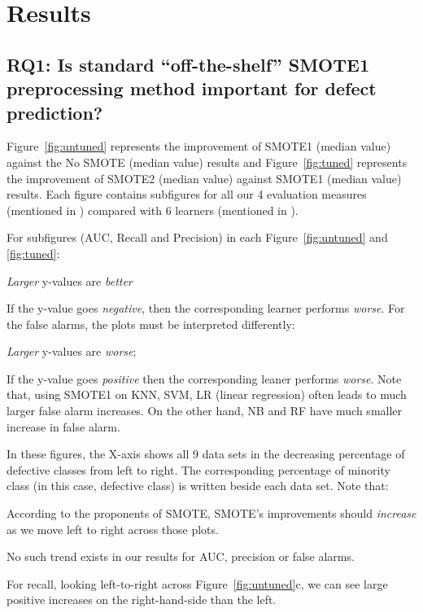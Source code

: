 \section{Results}
\label{sect:results}

\subsection{\textbf{RQ1: Is standard ``off-the-shelf'' SMOTE1 preprocessing method important for defect prediction?}}
Figure~\ref{fig:untuned} represents the improvement of SMOTE1 (median value) against the No SMOTE (median value) results and Figure~\ref{fig:tuned} represents the improvement of SMOTE2 (median value) against SMOTE1 (median value) results. Each figure contains subfigures for all our 4 evaluation measures (mentioned in ) compared with 6 learners (mentioned in ). 



For subfigures (AUC, Recall and Precision) in each Figure~\ref{fig:untuned} and \ref{fig:tuned}:
\bi
\item 
{\em Larger} y-values
are {\em better} 
\item
If the y-value goes {\em negative}, then the corresponding learner performs {\em worse}. 
\ei
For the false alarms, the
plots must be interpreted differently:
\bi
\item
{\em Larger} y-values are {\em worse};
\item
If the y-value goes {\em positive} then
the corresponding leaner
performs {\em worse}.
\ei
Note that, using SMOTE1 on KNN, SVM,
LR (linear regression) often
leads to much larger false alarm increases.
On the other hand,   NB
and RF have much smaller
increase in false alarm.

In these figures, the
X-axis shows all 9 data sets in the decreasing percentage of defective classes from left to right. The corresponding percentage of minority class (in this case, defective class) is written beside each data set. Note that:
\bi
\item
According to the proponents
of SMOTE, SMOTE's improvements should
{\em increase} as we move left to right
across those plots.
\item
No such trend exists in our results for
AUC, precision or false alarms.
\item
For recall, looking left-to-right across
Figure~\ref{fig:untuned}c, we can see
large positive increases on the
right-hand-side than the left.
\ei

